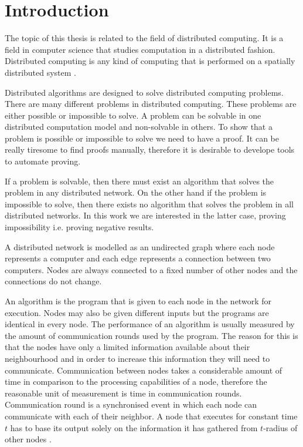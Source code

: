 
\section{Introduction}  \label{sec:introduction}
The topic of this thesis is related to the field of distributed computing.
It is a field in computer science that studies computation in a distributed fashion.
Distributed computing is any kind of computing that is performed on a spatially distributed system
\cite{DBLP:books/el/leeuwen90/LamportL90}.

Distributed algorithms are designed to solve distributed computing problems.
There are many different problems in distributed computing.
These problems are either possible or impossible to solve.
A problem can be solvable in one distributed computation model and non-solvable in others.
To show that a problem is possible or impossible to solve we need to have a proof.
It can be really tiresome to find proofs manually, therefore it is desirable to develope tools to automate proving.

If a problem is solvable, then there must exist an algorithm that solves the problem in any distributed network.
On the other hand if the problem is impossible to solve, then there exists no algorithm that solves the problem in all distributed networks.
In this work we are interested in the latter case, proving impossibility i.e. proving negative results.

A distributed network is modelled as an undirected graph where each node represents a computer and each edge represents a connection between two computers.
Nodes are always connected to a fixed number of other nodes and the connections do not change.
\cite{DBLP:journals/siamcomp/NaorS95}

An algorithm is the program that is given to each node in the network for execution.
Nodes may also be given different inputs but the programs are identical in every node.
The performance of an algorithm is usually measured by the amount of communication rounds used by the program.
The reason for this is that the nodes have only a limited information available about their neighbourhood and in order to increase this information they will need to communicate.
Communication between nodes takes a considerable amount of time in comparison to the processing capabilities of a node, therefore the reasonable unit of measurement is time in communication rounds.
Communication round is a synchronised event in which each node can communicate with each of their neighbor.
A node that executes for constant time $t$ has to base its output solely on the information it has gathered from $t$-radius of other nodes
\cite{DBLP:journals/siamcomp/NaorS95}.

